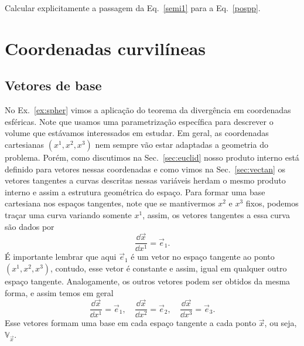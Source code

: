 \begin{Exercise}[title={Cálculo integral}]
	\Question[difficulty=1] Calcular explicitamente a passagem da Eq.~\eqref{semi1} para a Eq.~\eqref{pospp}.
\end{Exercise}


\section{Coordenadas curvilíneas}

\subsection{Vetores de base}

No Ex.~\ref{ex:spher} vimos a aplicação do teorema da divergência em coordenadas
esféricas. Note que usamos uma parametrização específica para descrever o volume
que estávamos interessados em estudar. Em geral, as coordenadas cartesianas
$(x^1, x^2, x^3)$ nem sempre vão estar adaptadas a geometria do problema. Porém,
como discutimos na Sec.~\ref{sec:euclid} nosso produto interno está definido
para vetores nessas coordenadas e como vimos na Sec.~\ref{sec:vectan} os vetores
tangentes a curvas descritas nessas variáveis herdam o mesmo produto interno e
assim a estrutura geométrica do espaço. Para formar uma base cartesiana nos
espaços tangentes, note que se mantivermos $x^2$ e $x^3$ fixos, podemos
traçar uma curva variando somente $x^1$, assim, os vetores tangentes a
essa curva são dados por
\begin{equation}
	\frac{\dd \vec{x}}{\dd x^1} = \vec{e}_1.
\end{equation}
É importante lembrar que aqui $\vec{e}_1$ é um vetor no espaço tangente ao ponto
$(x^1,x^2,x^3)$, contudo, esse vetor é constante e assim, igual em qualquer
outro espaço tangente. Analogamente, os outros vetores podem ser obtidos da
mesma forma, e assim temos em geral
\begin{equation}
	\frac{\dd \vec{x}}{\dd x^1} = \vec{e}_1,\quad \frac{\dd \vec{x}}{\dd x^2} = \vec{e}_2, \quad \frac{\dd \vec{x}}{\dd x^3} = \vec{e}_3.
\end{equation}
Esse vetores formam uma base em cada espaço tangente a cada ponto $\vec{x}$, ou
seja, $\mathbb{V}_{\vec{x}}$.

